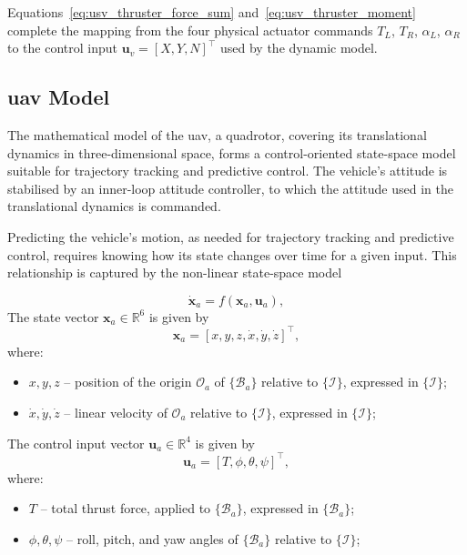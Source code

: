 Equations~\eqref{eq:usv_thruster_force_sum} and~\eqref{eq:usv_thruster_moment} complete the mapping from the four physical actuator commands $T_L$, $T_R$, $\alpha_L$, $\alpha_R$ to the control input $\mathbf{u}_v = [X, Y, N]^\top$ used by the dynamic model.


\subsection{\texorpdfstring{\gls{uav} Model}{UAV Model}}
\label{sec:mod_uav}

The mathematical model of the \gls{uav}, a quadrotor, covering its translational dynamics in three-dimensional space, forms a control-oriented state-space model suitable for trajectory tracking and predictive control.
The vehicle's attitude is stabilised by an inner-loop attitude controller, to which the attitude used in the translational dynamics is commanded.

Predicting the vehicle's motion, as needed for trajectory tracking and predictive control, requires knowing how its state changes over time for a given input. This relationship is captured by the non-linear state-space model

\begin{equation}
    \label{eq:uav_state_space_generic}
    \dot{\mathbf{x}}_a = f(\mathbf{x}_a, \mathbf{u}_a),
\end{equation}
The state vector $\mathbf{x}_a \in \mathbb{R}^6$ is given by
\begin{equation}
    \label{eq:uav_state_vector}
    \mathbf{x}_a = [x, y, z, \dot{x}, \dot{y}, \dot{z}]^\top,
\end{equation}
where:
\begin{itemize}
    \item $x, y, z$ -- position of the origin $\mathcal{O}_a$ of $\{\mathcal{B}_a\}$ relative to $\{\mathcal{I}\}$, expressed in $\{\mathcal{I}\}$;
    \item $\dot{x}, \dot{y}, \dot{z}$ -- linear velocity of $\mathcal{O}_a$ relative to $\{\mathcal{I}\}$, expressed in $\{\mathcal{I}\}$;
\end{itemize}
The control input vector $\mathbf{u}_a \in \mathbb{R}^4$ is given by
\begin{equation}
    \label{eq:uav_input_vector}
    \mathbf{u}_a = [T, \phi, \theta, \psi]^\top,
\end{equation}
where:
\begin{itemize}
    \item $T$ -- total thrust force, applied to $\{\mathcal{B}_a\}$, expressed in $\{\mathcal{B}_a\}$;
    \item $\phi, \theta, \psi$ -- roll, pitch, and yaw angles of $\{\mathcal{B}_a\}$ relative to $\{\mathcal{I}\}$;
\end{itemize}

